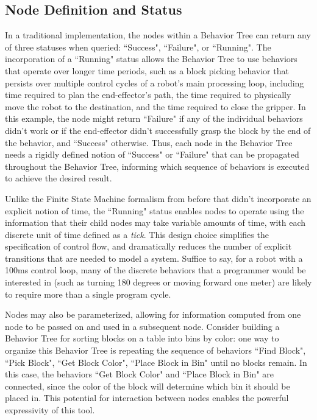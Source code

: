 \subsection{Node Definition and Status}
In a traditional implementation, the nodes within a Behavior Tree can return any of three statuses when queried: ``Success", ``Failure", or ``Running". The incorporation of a ``Running" status allows the Behavior Tree to use behaviors that operate over longer time periods, such as a block picking behavior that persists over multiple control cycles of a robot's main processing loop, including time required to plan the end-effector's path, the time required to physically move the robot to the destination, and the time required to close the gripper. In this example, the node might return ``Failure" if any of the individual behaviors didn't work or if the end-effector didn't successfully grasp the block by the end of the behavior, and ``Success" otherwise. Thus, each node in the Behavior Tree needs a rigidly defined notion of ``Success" or ``Failure" that can be propagated throughout the Behavior Tree, informing which sequence of behaviors is executed to achieve the desired result.

Unlike the Finite State Machine formalism from before that didn't incorporate an explicit notion of time, the ``Running" status enables nodes to operate using the information that their child nodes may take variable amounts of time, with each discrete unit of time defined as a \emph{tick}. This design choice simplifies the specification of control flow, and dramatically reduces the number of explicit transitions that are needed to model a system. Suffice to say, for a robot with a 100ms control loop, many of the discrete behaviors that a programmer would be interested in (such as turning 180 degrees or moving forward one meter) are likely to require more than a single program cycle.

Nodes may also be parameterized, allowing for information computed from one node to be passed on and used in a subsequent node. Consider building a Behavior Tree for sorting blocks on a table into bins by color: one way to organize this Behavior Tree is repeating the sequence of behaviors ``Find Block", ``Pick Block", ``Get Block Color", ``Place Block in Bin" until no blocks remain. In this case, the behaviors ``Get Block Color" and ``Place Block in Bin" are connected, since the color of the block will determine which bin it should be placed in. This potential for interaction between nodes enables the powerful expressivity of this tool.

